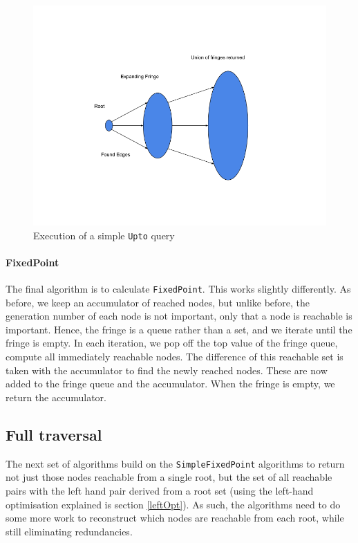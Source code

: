 \documentclass[12pt,a4paper,twoside,openright]{report}
\newcommand\codeName[1]{\texttt{#1}}
\begin{document}
\begin{figure}[ht]
\centering
  \includegraphics[width=\textwidth]{figs/Upto.png}
  \caption{Execution of a simple \codeName{Upto} query}
  \label{fig:UptoSingle}
\end{figure}
	
		\paragraph{FixedPoint}
The  final algorithm is to calculate \codeName{FixedPoint}. This works slightly differently. As before, we keep an accumulator of reached nodes, but unlike before, the generation number of each node is not important, only that a node is reachable is important. Hence, the fringe is a queue rather than a set, and we iterate until the fringe is empty. In each iteration, we pop off the top value of the fringe queue, compute all immediately reachable nodes. The difference of this reachable set is taken with the accumulator to find the newly reached nodes. These are now added to the fringe queue and the accumulator. When the fringe is empty, we return the accumulator.
	
	\subsection{Full traversal}
		The next set of algorithms build on the \codeName{SimpleFixedPoint} algorithms to return not just those nodes reachable from a single root, but the set of all reachable pairs with the left hand pair derived from a root set (using the left-hand optimisation explained is section \ref{leftOpt}). As such, the algorithms need to do some more work to reconstruct which nodes are reachable from each root, while still eliminating redundancies.
\end{document}
